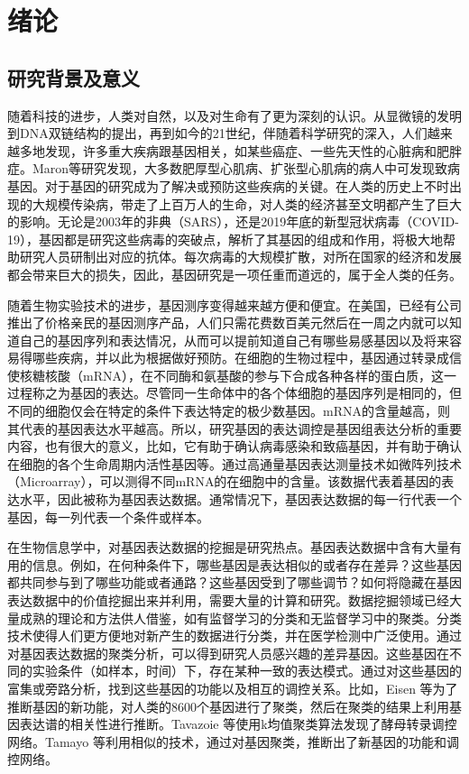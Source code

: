 \chapter{绪论}

\section{研究背景及意义}
    随着科技的进步，人类对自然，以及对生命有了更为深刻的认识。从显微镜的发明到DNA双链结构的提出，再到如今的21世纪，伴随着科学研究的深入，人们越来越多地发现，许多重大疾病跟基因相关，如某些癌症、一些先天性的心脏病和肥胖症。Maron等研究发现，大多数肥厚型心肌病、扩张型心肌病的病人中可发现致病基因。对于基因的研究成为了解决或预防这些疾病的关键。在人类的历史上不时出现的大规模传染病，带走了上百万人的生命，对人类的经济甚至文明都产生了巨大的影响。无论是2003年的非典（SARS），还是2019年底的新型冠状病毒（COVID-19），基因都是研究这些病毒的突破点，解析了其基因的组成和作用，将极大地帮助研究人员研制出对应的抗体。每次病毒的大规模扩散，对所在国家的经济和发展都会带来巨大的损失，因此，基因研究是一项任重而道远的，属于全人类的任务。

    随着生物实验技术的进步，基因测序变得越来越方便和便宜。在美国，已经有公司推出了价格亲民的基因测序产品，人们只需花费数百美元然后在一周之内就可以知道自己的基因序列和表达情况，从而可以提前知道自己有哪些易感基因以及将来容易得哪些疾病，并以此为根据做好预防。在细胞的生物过程中，基因通过转录成信使核糖核酸（mRNA），在不同酶和氨基酸的参与下合成各种各样的蛋白质，这一过程称之为基因的表达。尽管同一生命体中的各个体细胞的基因序列是相同的，但不同的细胞仅会在特定的条件下表达特定的极少数基因。mRNA的含量越高，则其代表的基因表达水平越高。所以，研究基因的表达调控是基因组表达分析的重要内容，也有很大的意义，比如，它有助于确认病毒感染和致癌基因，并有助于确认在细胞的各个生命周期内活性基因等。通过高通量基因表达测量技术如微阵列技术（Microarray），可以测得不同mRNA的在细胞中的含量。该数据代表着基因的表达水平，因此被称为基因表达数据。通常情况下，基因表达数据的每一行代表一个基因，每一列代表一个条件或样本。

    在生物信息学中，对基因表达数据的挖掘是研究热点。基因表达数据中含有大量有用的信息。例如，在何种条件下，哪些基因是表达相似的或者存在差异？这些基因都共同参与到了哪些功能或者通路？这些基因受到了哪些调节？如何将隐藏在基因表达数据中的价值挖掘出来并利用，需要大量的计算和研究。数据挖掘领域已经大量成熟的理论和方法供人借鉴，如有监督学习的分类和无监督学习中的聚类。分类技术使得人们更方便地对新产生的数据进行分类，并在医学检测中广泛使用。通过对基因表达数据的聚类分析，可以得到研究人员感兴趣的差异基因。这些基因在不同的实验条件（如样本，时间）下，存在某种一致的表达模式。通过对这些基因的富集或旁路分析，找到这些基因的功能以及相互的调控关系。比如，Eisen 等为了推断基因的新功能，对人类的8600个基因进行了聚类，然后在聚类的结果上利用基因表达谱的相关性进行推断。Tavazoie 等使用k均值聚类算法发现了酵母转录调控网络。Tamayo 等利用相似的技术，通过对基因聚类，推断出了新基因的功能和调控网络。 

